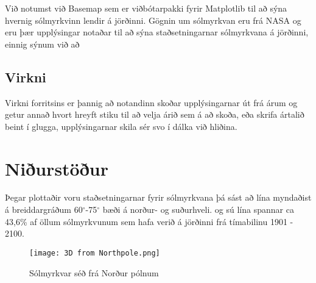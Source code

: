 \documentclass[12pt, git, final]{rureport}
\begin{document}
Við notumst við Basemap\cite{basemap} sem er viðbótarpakki fyrir Matplotlib til að sýna hvernig sólmyrkvinn lendir á jörðinni. Gögnin um sólmyrkvan eru frá NASA og eru þær upplýsingar notaðar til að sýna staðsetningarnar sólmyrkvana á jörðinni, einnig sýnum við að 

\subsection{Virkni}
Virkni forritsins er þannig að notandinn skoðar upplýsingarnar út frá árum og getur annað hvort hreyft stiku til að velja árið sem á að skoða, eða skrifa ártalið beint í glugga, upplýsingarnar skila sér svo í dálka við hliðina.



\section{Niðurstöður}\label{nidurstodur}
Þegar plottaðir voru staðsetningarnar fyrir sólmyrkvana þá sást að lína myndaðist á breiddargráðum 60$^{\circ}$-75$^{\circ}$ bæði á norður- og suðurhveli. og sú lína spannar ca 43,6\% af öllum sólmyrkvunum sem hafa verið á jörðinni frá tímabilinu 1901 - 2100. 


\pagebreak

\begin{figure}
	\centering 
	\texttt{[image: 3D from Northpole.png]}
	\caption{Sólmyrkvar séð frá Norður pólnum \label{fig:3DNP}}
\end{figure}

\clearpage

\printbibliography
\end{document}
